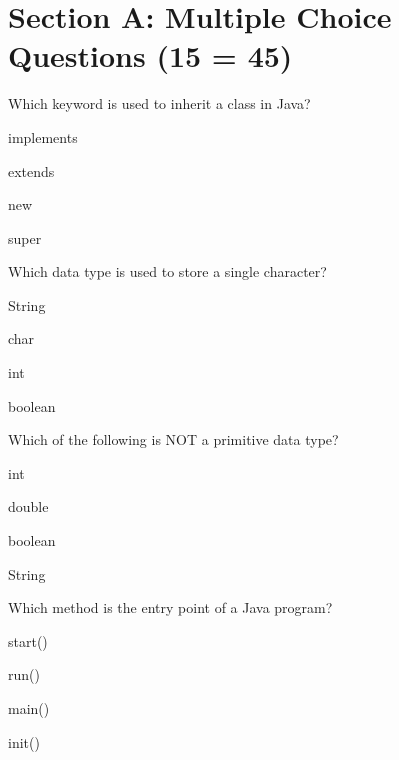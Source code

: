 \documentclass{CWNUExam}
\begin{document}
\maketitle

\section{Section A: Multiple Choice Questions (15  = 45)}

\begin{question}
Which keyword is used to inherit a class in Java?
\paren
\begin{choices}
\item implements
\item extends
\item new
\item super
\end{choices}
\end{question}

\begin{question}
Which data type is used to store a single character?
\paren
\begin{choices}
\item String
\item char
\item int
\item boolean
\end{choices}
\end{question}

\begin{question}
Which of the following is NOT a primitive data type?
\paren
\begin{choices}
\item int
\item double
\item boolean
\item String
\end{choices}
\end{question}

\begin{question}
Which method is the entry point of a Java program?
\paren
\begin{choices}
\item start()
\item run()
\item main()
\item init()
\end{choices}
\end{question}
\end{document}
